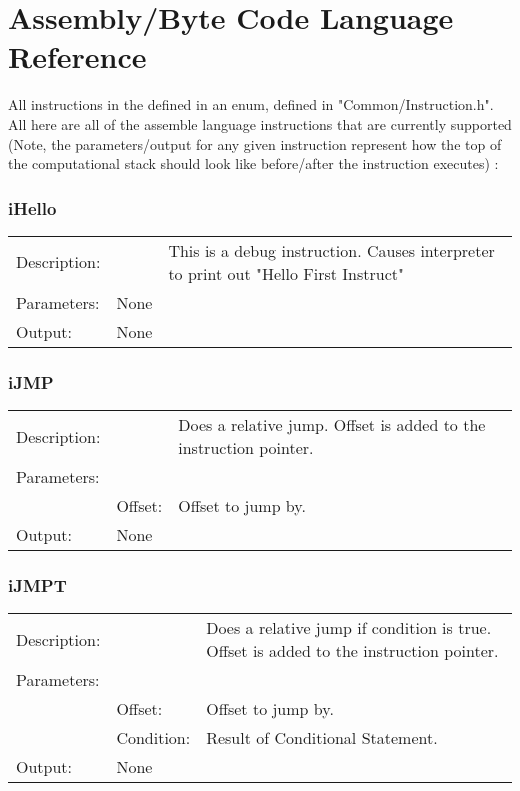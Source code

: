\documentclass{report}
\begin{document}
\chapter{Assembly/Byte Code Language Reference}
	All instructions in the defined in an enum, defined in "Common/Instruction.h".
	All here are all of the assemble language instructions that are currently supported (Note, the parameters/output for any given instruction represent how the top of the computational stack should look like before/after the instruction executes) :

\subsection{iHello}
\begin{tabular}{l l p{10cm}}
Description: & ~    & This is a debug instruction. Causes interpreter to print out "Hello First Instruct"\\
Parameters:  & None & ~ \\
Output:      & None & ~ \\
\end{tabular}


\subsection{iJMP}
\begin{tabular}{l l p{10cm}}
Description: & ~    & Does a relative jump. Offset is added to the instruction pointer.\\
Parameters:  & ~ & ~ \\
~			 & Offset: & Offset to jump by.\\
Output:      & None & ~ \\
\end{tabular}

\subsection{iJMPT}
\begin{tabular}{l l p{10cm}}
Description: & ~    & Does a relative jump if condition is true. Offset is added to the instruction pointer.\\
Parameters:  & ~ & ~ \\
~			 & Offset: & Offset to jump by.\\
~			 & Condition: & Result of Conditional Statement.\\
Output:      & None & ~ \\
\end{tabular}
\end{document}
